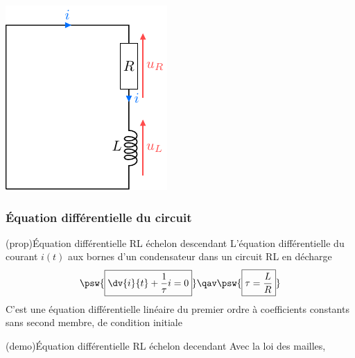 \documentclass[../../main/main.tex]{subfiles}
\begin{document}
\begin{tcb*}[sidebyside, righthand ratio=.30]
\begin{center}
{			\includegraphics[width=.9\linewidth]{circ_rl-decharge}
		}%
		\label{fig:circ_rl-decharge}
	\end{center}
\end{tcb*}

\subsubsection{Équation différentielle du circuit}
\begin{tcb*}[label=prop:eqdiffrl, sidebyside,
		list entry={\lte\theprop~:~Équa. diff. RL descendant}]
	(prop){Équation différentielle RL échelon descendant}
	L'équation différentielle du courant $i(t)$ aux bornes d'un
	condensateur dans un circuit RL en décharge
	\[
		\psw{%
			\boxed{\dv{i}{t} + \frac{1}{\tau}i = 0}
		}%
		\qav
		\psw{%
			\boxed{\tau = \frac{L}{R}}
		}%
	\]
	\tcblower
	C'est une équation différentielle linéaire du premier ordre à
	coefficients constants sans second membre, de condition initiale
	\psw{%
		\[ \boxed{i(0^-) = i(0^+) = \frac{E}{R}}\]
	}%
\end{tcb*}
\begin{tcb*}[label=demo:eqdiffrl,
		list entry={\lte\thedemo~:~Équa. diff. RL descendant}]
	(demo){Équation différentielle RL échelon decendant}
	Avec la loi des mailles,
\end{tcb*}
\end{document}

